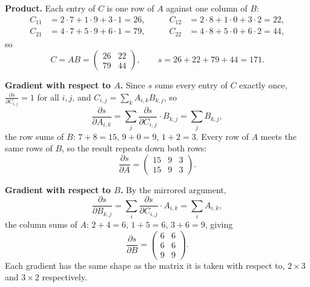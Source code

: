 \begin{answer}
  \textbf{Product.} Each entry of $C$ is one row of $A$ against one column of $B$:
  \[
    \begin{aligned}
      C_{11} &= 2\cdot 7 + 1\cdot 9 + 3\cdot 1 = 26, &\qquad
      C_{12} &= 2\cdot 8 + 1\cdot 0 + 3\cdot 2 = 22, \\
      C_{21} &= 4\cdot 7 + 5\cdot 9 + 6\cdot 1 = 79, &\qquad
      C_{22} &= 4\cdot 8 + 5\cdot 0 + 6\cdot 2 = 44,
    \end{aligned}
  \]
  so
  \[
    C = AB = \begin{pmatrix} 26 & 22 \\ 79 & 44 \end{pmatrix},
    \qquad
    s = 26 + 22 + 79 + 44 = 171 .
  \]

  \medskip
  \textbf{Gradient with respect to $A$.} Since $s$ sums every entry of $C$ exactly once,
  $\frac{\partial s}{\partial C_{i,j}} = 1$ for all $i,j$, and $C_{i,j} = \sum_k A_{i,k} B_{k,j}$, so
  \[
    \frac{\partial s}{\partial A_{i,k}}
      = \sum_j \frac{\partial s}{\partial C_{i,j}} \cdot B_{k,j}
      = \sum_j B_{k,j},
  \]
  the row sums of $B$: $7+8=15$, $9+0=9$, $1+2=3$. Every row of $A$ meets the same rows of $B$, so
  the result repeats down both rows:
  \[
    \frac{\partial s}{\partial A} = \begin{pmatrix} 15 & 9 & 3 \\ 15 & 9 & 3 \end{pmatrix}.
  \]

  \medskip
  \textbf{Gradient with respect to $B$.} By the mirrored argument,
  \[
    \frac{\partial s}{\partial B_{k,j}}
      = \sum_i \frac{\partial s}{\partial C_{i,j}} \cdot A_{i,k}
      = \sum_i A_{i,k},
  \]
  the column sums of $A$: $2+4=6$, $1+5=6$, $3+6=9$, giving
  \[
    \frac{\partial s}{\partial B} = \begin{pmatrix} 6 & 6 \\ 6 & 6 \\ 9 & 9 \end{pmatrix}.
  \]
  Each gradient has the same shape as the matrix it is taken with respect to, $2 \times 3$ and
  $3 \times 2$ respectively.
\end{answer}

